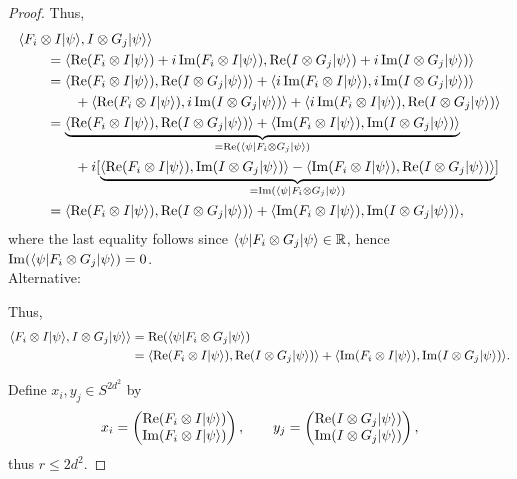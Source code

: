 \begin{proof}
		Thus,
		\begin{align*}
			&\sclr{F_i\tensor I \dr{\psi}}{I\tensor G_j \dr{\psi}}\\
			 &\qquad= \sclr{\Real(F_i\tensor I \dr{\psi})+i\Imag(F_i\tensor I \dr{\psi})}{\Real(I\tensor G_j \dr{\psi})+i\Imag(I\tensor G_j \dr{\psi})} \\
			&\qquad= \sclr{\Real(F_i\tensor I \dr{\psi})}{\Real(I\tensor G_j \dr{\psi})}+\sclr{i\Imag(F_i\tensor I \dr{\psi})}{i\Imag(I\tensor G_j \dr{\psi})}\\
			&\qquad\qquad+\sclr{\Real(F_i\tensor I \dr{\psi})}{i\Imag(I\tensor G_j \dr{\psi})}+\sclr{i\Imag(F_i\tensor I \dr{\psi})}{\Real(I\tensor G_j \dr{\psi})}\\
			&\qquad= \underbrace{\sclr{\Real(F_i\tensor I \dr{\psi})}{\Real(I\tensor G_j \dr{\psi})}+\sclr{\Imag(F_i\tensor I \dr{\psi})}{\Imag(I\tensor G_j \dr{\psi})}}_{=\Real(\dl{\psi} F_i\tensor G_j \dr{\psi})}\\
			&\qquad\qquad +i[\underbrace{\sclr{\Real(F_i\tensor I \dr{\psi})}{\Imag(I\tensor G_j \dr{\psi})}-\sclr{\Imag(F_i\tensor I \dr{\psi})}{\Real(I\tensor G_j \dr{\psi})}}_{=\Imag(\dl{\psi} F_i\tensor G_j \dr{\psi})}] \\
			&\qquad=\sclr{\Real(F_i\tensor I \dr{\psi})}{\Real(I\tensor G_j \dr{\psi})}+\sclr{\Imag(F_i\tensor I \dr{\psi})}{\Imag(I\tensor G_j \dr{\psi})},
		\end{align*}
		where the last equality follows since $\dl{\psi} F_i\tensor G_j \dr{\psi}\in\mathbb{R}$, hence $\Imag(\dl{\psi} F_i\tensor G_j \dr{\psi})=0$.\\
		
		Alternative:
		
		Thus,
		\begin{align*}
			\sclr{F_i\tensor I \dr{\psi}}{I\tensor G_j \dr{\psi}} &=\Real(\dl{\psi} F_i\tensor G_j \dr{\psi})\\
			&=\sclr{\Real(F_i\tensor I \dr{\psi})}{\Real(I\tensor G_j \dr{\psi})}+\sclr{\Imag(F_i\tensor I \dr{\psi})}{\Imag(I\tensor G_j \dr{\psi})}.
		\end{align*}
		
		Define $x_i,y_j \in S^{2d^2}$ by
		\begin{align}
			x_i = \begin{pmatrix}
				\Real(F_i\tensor I \dr{\psi}) \\
				\Imag(F_i\tensor I \dr{\psi})
			\end{pmatrix}, \qquad
			y_j = \begin{pmatrix}
				\Real(I\tensor G_j \dr{\psi})\\
				\Imag(I\tensor G_j \dr{\psi})
			\end{pmatrix}, 
		\end{align}
		thus $r\leq 2d^2$.
		

\end{proof}
